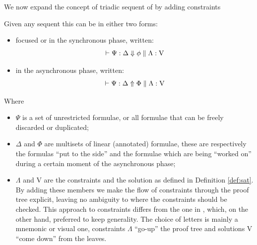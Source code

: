 \documentclass[a4paper, 12pt, english]{report}
\begin{document}
We now expand the concept of triadic sequent of \cite{Focusing} by adding constraints
\begin{define}
	Given any sequent this can be in either two forms:
	\begin{itemize}
		\item focused or in the synchronous phase, written:
			$$\vdash \Psi : \Delta \Downarrow \phi \; \Vert \; \Lambda : \mathrm{V}$$
		\item in the asynchronous phase, written:
			$$\vdash \Psi : \Delta \Uparrow \Phi \; \Vert \; \Lambda : \mathrm{V}$$
	\end{itemize}
	Where 
	\begin{itemize}
		\item $\Psi$ is a set of unrestricted formulae, or all formulae that can be freely discarded or duplicated;
		\item $\Delta$ and $\Phi$ are multisets of linear (annotated) formulae, these are respectively the formulas ``put to the side'' and the formulae which are being ``worked on'' during a certain moment of the asynchronous phase;
		\item $\Lambda$ and V are the constraints and the solution as defined in Definition \ref{def:sat}.
			By adding these members we make the flow of constraints through the proof tree explicit, leaving no ambiguity to where the constraints should be checked.
			This approach to constraints differs from the one in \cite{HarlandPym}, which, on the other hand, preferred to keep generality.
			The choice of letters is mainly a mnemonic or visual one, constraints $\Lambda$ ``go-up'' the proof tree and solutions V ``come down'' from the leaves.
	\end{itemize}
\end{define}
\end{document}
